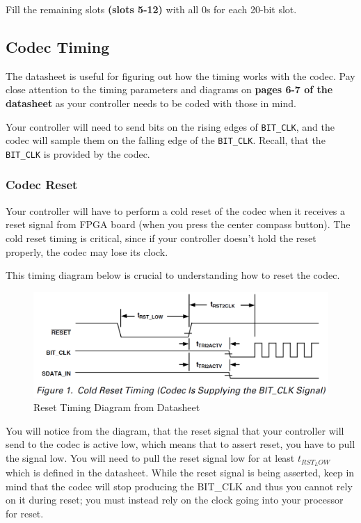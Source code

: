 \documentclass[11pt]{article}
\begin{document}
Fill the remaining slots \textbf{(slots 5-12)} with all 0s for each 20-bit slot.

\subsection{Codec Timing}
The datasheet is useful for figuring out how the timing works with the codec. Pay close attention to the timing parameters and diagrams on \textbf{pages 6-7 of the datasheet} as your controller needs to be coded with those in mind.

Your controller will need to send bits on the rising edges of \verb|BIT_CLK|, and the codec will sample them on the falling edge of the \verb|BIT_CLK|. Recall, that the \verb|BIT_CLK| is provided by the codec.

\subsubsection{Codec Reset}
Your controller will have to perform a cold reset of the codec when it receives a reset signal from FPGA board (when you press the center compass button). The cold reset timing is critical, since if your controller doesn't hold the reset properly, the codec may lose its clock.

This timing diagram below is crucial to understanding how to reset the codec.

\begin{figure}[hbt]
	\begin{center}
		\includegraphics[width=6in]{ac97_codec_timing}
		\caption{Reset Timing Diagram from Datasheet}
	\end{center}
\end{figure}

You will notice from the diagram, that the reset signal that your controller will send to the codec is active low, which means that to assert reset, you have to pull the signal low. You will need to pull the reset signal low for at least $t_{RST_LOW}$ which is defined in the datasheet. While the reset signal is being asserted, keep in mind that the codec will stop producing the BIT\_CLK and thus you cannot rely on it during reset; you must instead rely on the clock going into your processor for reset. \\
\end{document}
